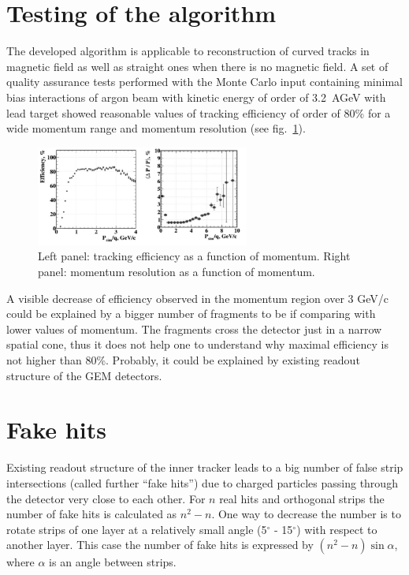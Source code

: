 \documentclass{webofc}
\begin{document}
\section{Testing of the algorithm}
\label{sec-2}

The developed algorithm is applicable to reconstruction of curved tracks in magnetic field as well as straight ones when there is no magnetic field.
A set of quality assurance tests performed with the Monte Carlo input containing minimal bias interactions of argon beam with kinetic energy of order of 3.2~AGeV with lead target showed
reasonable values of tracking efficiency of order of 80\% for a wide momentum range and momentum resolution (see fig.~\ref{QA}).
\begin{figure}[h]
  \centering
  \includegraphics[width=7cm,clip]{eff_momRes_ArPb}
  \caption{Left panel: tracking efficiency as a function of momentum. Right panel: momentum resolution as a function of momentum.}
  \label{QA}
\end{figure}

A visible decrease of efficiency observed in the momentum region over 3 GeV/c could be explained by a bigger number of fragments to be if comparing with lower values of momentum. 
The fragments cross the detector just in a narrow spatial cone, thus it does not help one to understand why maximal efficiency is not higher than 80\%.
Probably, it could be explained by existing readout structure of the GEM detectors.

\section{Fake hits}
\label{sec-3}
Existing readout structure of the inner tracker leads to a big number of false strip intersections (called further ``fake hits'') due to charged particles passing through the detector
very close to each other.
For $n$ real hits and orthogonal strips the number of fake hits is calculated as $n^2 - n$. One way to decrease the number is to rotate strips of one layer at a relatively small
angle (5$^\circ$ - 15$^\circ$) with respect to another layer. This case the number of fake hits is expressed by  $(n^2 - n) \sin{\alpha}$, where $\alpha$ is an angle between strips.
\end{document}
